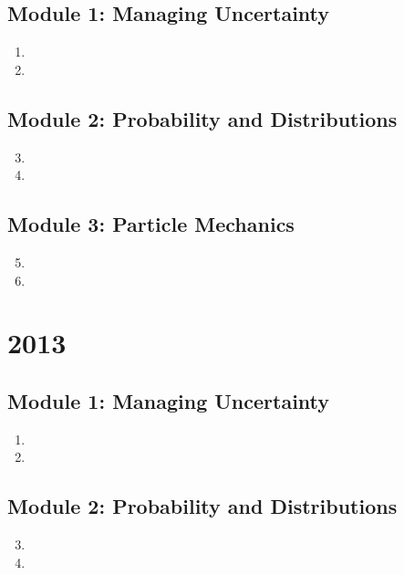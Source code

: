 \documentclass[fleqn,titlepage]{book}
\numberwithin{equation}{section}
\theoremstyle{plain}
\theoremstyle{definition}
\theoremstyle{remark}
\begin{document}
\section{Module 1: Managing Uncertainty}
\begin{enumerate}[label=\bfseries  \arabic*.]\setcounter{enumi}{0}
\item 
\item 
\end{enumerate}
\section{Module 2: Probability and Distributions}
\begin{enumerate}[label=\bfseries  \arabic*.]\setcounter{enumi}{2}
\item 
\item 
\end{enumerate}
\section{Module 3: Particle Mechanics}
\begin{enumerate}[label=\bfseries  \arabic*.]\setcounter{enumi}{4}
\item 
\item 
\end{enumerate}

\chapter{2013}
\section{Module 1: Managing Uncertainty}
\begin{enumerate}[label=\bfseries  \arabic*.]\setcounter{enumi}{0}
\item 
\item 
\end{enumerate}
\section{Module 2: Probability and Distributions}
\begin{enumerate}[label=\bfseries  \arabic*.]\setcounter{enumi}{2}
\item 
\item 
\end{enumerate}
\end{document}
